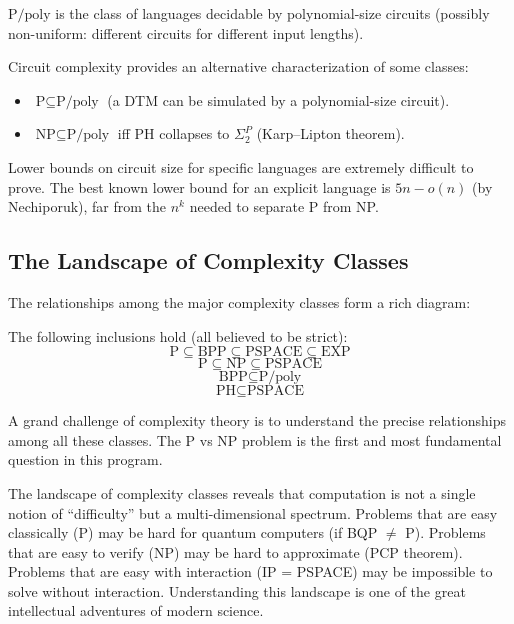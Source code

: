 \begin{definition}
$\text{P/poly}$ is the class of languages decidable by polynomial-size circuits (possibly non-uniform: different circuits for different input lengths).
\end{definition}

Circuit complexity provides an alternative characterization of some classes:
\begin{itemize}
  \item $\text{P} \subseteq \text{P/poly}$ (a DTM can be simulated by a polynomial-size circuit).
  \item $\text{NP} \subseteq \text{P/poly}$ iff $\text{PH}$ collapses to $\Sigma_2^P$ (Karp--Lipton theorem).
\end{itemize}

Lower bounds on circuit size for specific languages are extremely difficult to prove. The best known lower bound for an explicit language is $5n - o(n)$ (by Nechiporuk), far from the $n^k$ needed to separate P from NP.

\subsection{The Landscape of Complexity Classes}

The relationships among the major complexity classes form a rich diagram:

\begin{proposition}
The following inclusions hold (all believed to be strict):
\[
\text{P} \subseteq \text{BPP} \subseteq \text{PSPACE} \subseteq \text{EXP}
\]
\[
\text{P} \subseteq \text{NP} \subseteq \text{PSPACE}
\]
\[
\text{BPP} \subseteq \text{P/poly}
\]
\[
\text{PH} \subseteq \text{PSPACE}
\]
\end{proposition}

A grand challenge of complexity theory is to understand the precise relationships among all these classes. The P vs NP problem is the first and most fundamental question in this program.

\begin{remark}
The landscape of complexity classes reveals that computation is not a single notion of ``difficulty'' but a multi-dimensional spectrum. Problems that are easy classically (P) may be hard for quantum computers (if BQP $\neq$ P). Problems that are easy to verify (NP) may be hard to approximate (PCP theorem). Problems that are easy with interaction (IP = PSPACE) may be impossible to solve without interaction. Understanding this landscape is one of the great intellectual adventures of modern science.
\end{remark}

